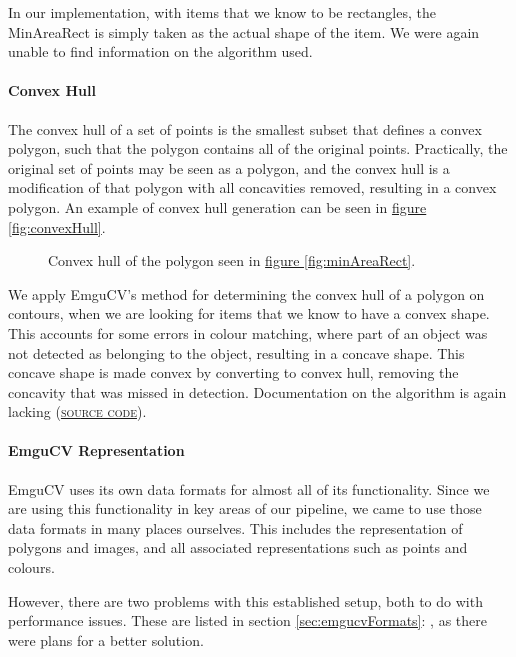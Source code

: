 \documentclass[10pt, abstracton, twocolumn]{scrartcl}
\newcommand{\fref}[1]{\hyperref[#1]{figure \vref{#1}}}
\newcommand{\sref}[1]{section \vref{#1}: \nameref{#1}}
\newcommand{\link}[2]{\textsc{\href{#1}{#2}}}
\begin{document}
In our implementation, with items that we know to be rectangles, the MinAreaRect is simply taken as the actual shape of the item. We were again unable to find information on the algorithm used.

\paragraph{Convex Hull}
The convex hull of a set of points is the smallest subset that defines a convex polygon, such that the polygon contains all of the original points. Practically, the original set of points may be seen as a polygon, and the convex hull is a modification of that polygon with all concavities removed, resulting in a convex polygon. An example of convex hull generation can be seen in \fref{fig:convexHull}.

\begin{figure}[h]
        \centering
        
        \caption{\small Convex hull of the polygon seen in \fref{fig:minAreaRect}.}
        \label{fig:convexHull}
\end{figure}

We apply EmguCV's method for determining the convex hull of a polygon on contours, when we are looking for items that we know to have a convex shape. This accounts for some errors in colour matching, where part of an object was not detected as belonging to the object, resulting in a concave shape. This concave shape is made convex by converting to convex hull, removing the concavity that was missed in detection. Documentation on the algorithm is again lacking (\link{https://github.com/Itseez/opencv/blob/ef91d7e8830c36785f0b6fdbf2045da48413dd76/modules/imgproc/src/convhull.cpp\#L129}{source code}).

\paragraph{EmguCV Representation}
EmguCV uses its own data formats for almost all of its functionality. Since we are using this functionality in key areas of our pipeline, we came to use those data formats in many places ourselves. This includes the representation of polygons and images, and all associated representations such as points and colours.

However, there are two problems with this established setup, both to do with performance issues. These are listed in \sref{sec:emgucvFormats}, as there were plans for a better solution.
\end{document}
